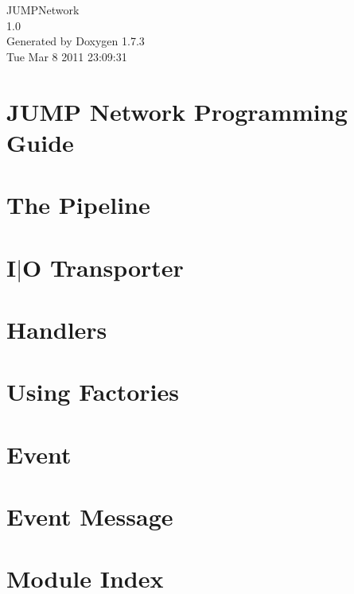 \documentclass[a4paper]{book}
\begin{document}
\hypersetup{pageanchor=false}
\begin{titlepage}
\vspace*{7cm}
\begin{center}
{\Large JUMPNetwork \\[1ex]\large 1.0 }\\
\vspace*{1cm}
{\large Generated by Doxygen 1.7.3}\\
\vspace*{0.5cm}
{\small Tue Mar 8 2011 23:09:31}\\
\end{center}
\end{titlepage}
\clearemptydoublepage
{}
\tableofcontents
\clearemptydoublepage
{}
\hypersetup{pageanchor=true}
\chapter{JUMP Network Programming Guide}
\label{index}\hypertarget{index}{}
\chapter{The Pipeline}
\label{the_pipeline}
\hypertarget{the_pipeline}{}

\chapter{I$|$O Transporter}
\label{transporter_page}
\hypertarget{transporter_page}{}

\chapter{Handlers}
\label{handlers_page}
\hypertarget{handlers_page}{}

\chapter{Using Factories}
\label{factories_page}
\hypertarget{factories_page}{}

\chapter{Event}
\label{events_page}
\hypertarget{events_page}{}

\chapter{Event Message}
\label{messages_page}
\hypertarget{messages_page}{}

\chapter{Module Index}

\end{document}

